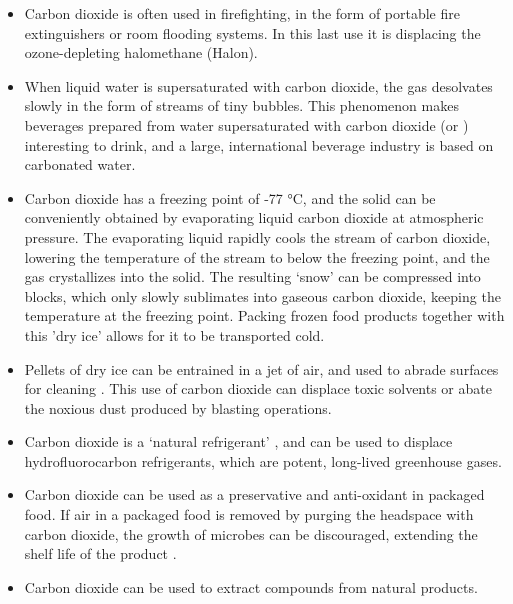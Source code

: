 \begin{itemize}
  
  \item Carbon dioxide is often used in firefighting, in the form of portable
  fire extinguishers or room flooding systems. In this last use it is
  displacing the ozone-depleting halomethane (Halon).
  
  \item When liquid water is supersaturated with carbon dioxide, the gas
  desolvates slowly in the form of streams of tiny bubbles. This phenomenon
  makes beverages prepared from water supersaturated with carbon dioxide (or
  ) interesting to drink, and a large, international
  beverage industry is based on carbonated water.
   
   \item Carbon dioxide has a freezing point of {-}77 °C, and the solid can be
   conveniently obtained by evaporating liquid carbon dioxide at atmospheric
   pressure. The evaporating liquid rapidly cools the stream of carbon dioxide,
   lowering the temperature of the stream to below the freezing point, and the
   gas crystallizes into the solid. The resulting `snow' can be compressed into
   blocks, which only slowly sublimates into gaseous carbon dioxide, keeping the
   temperature at the freezing point. Packing frozen food products together with
   this 'dry ice' allows for it to be transported cold.
   
   \item Pellets of dry ice can be entrained in a jet of air, and used to abrade
   surfaces for cleaning \autocite{Spur1999}. This use of carbon dioxide can
   displace toxic solvents or abate the noxious dust produced by blasting operations.
   
   \item Carbon dioxide is a `natural refrigerant' \autocite{Pearson2005}, and
   can be used to displace hydrofluorocarbon refrigerants, which are potent,
   long-lived greenhouse gases.
   
   \item Carbon dioxide can be used as a preservative and anti-oxidant in
   packaged food. If air in a packaged food is removed by purging the headspace
   with carbon dioxide, the growth of microbes can be discouraged, extending the
   shelf life of the product \autocite{Jacobsen2002}.
	   
	\item Carbon dioxide can be used to extract compounds from natural products. 
	
\end{itemize}

